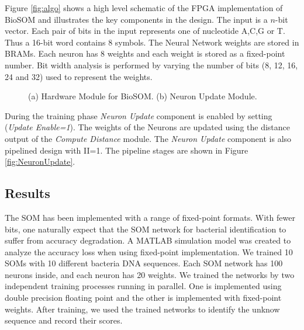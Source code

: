 \documentclass[a4paper,10pt]{article}
\begin{document}
Figure \ref{fig:algo} shows a high level schematic of the FPGA implementation of BioSOM and illustrates the key components in the design. The input is a $n$-bit vector. Each pair of bits in the input represents one of nucleotide A,C,G or T. Thus a 16-bit word contains 8 symbols.  The Neural Network weights are stored in BRAMs. Each neuron has 8 weights and each weight is stored as a fixed-point number. Bit width analysis is performed by varying the number of bits (8, 12, 16, 24 and 32) used to represent the weights.

\begin{figure}[!htb]
	\centering
	\hfil
	\caption{(a) Hardware Module for BioSOM. (b) Neuron Update Module.}	\label{fig:SOMFPGAImplementation}
	\vspace{-1.0em}	
\end{figure}

During the training phase \textit{Neuron Update} component is enabled by setting (\textit{Update Enable=1}). The weights of the Neurons are updated using the distance output of the \textit{Compute Distance} module. The \textit{Neuron Update} component is also pipelined design with II=1. The pipeline stages are shown in Figure \ref{fig:NeuronUpdate}.
\subsection{Results}
The SOM has been implemented with a range of fixed-point formats. With fewer bits, one naturally expect that the SOM network for bacterial identification to suffer from accuracy degradation. A MATLAB simulation model was created to analyze the accuracy loss when using fixed-point implementation. We trained 10 SOMs with 10 different bacteria DNA sequences. Each SOM network has 100 neurons inside, and each neuron has 20 weights. We trained the networks by two independent training processes running in parallel. One is implemented using double precision floating point and the other is implemented with fixed-point weights. After training, we used the trained networks to identify the unknow sequence and record their scores.
\end{document}

